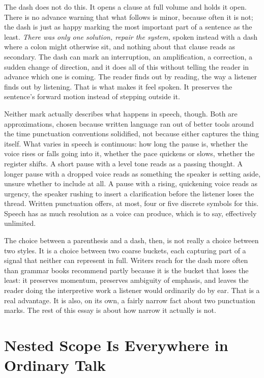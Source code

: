 \documentclass[11pt]{article}
\begin{document}
The dash does not do this. It opens a clause at full volume and holds it open. There is no advance warning that what follows is minor, because often it is not; the dash is just as happy marking the most important part of a sentence as the least. \emph{There was only one solution, repair the system,} spoken instead with a dash where a colon might otherwise sit, and nothing about that clause reads as secondary. The dash can mark an interruption, an amplification, a correction, a sudden change of direction, and it does all of this without telling the reader in advance which one is coming. The reader finds out by reading, the way a listener finds out by listening. That is what makes it feel spoken. It preserves the sentence's forward motion instead of stepping outside it.

Neither mark actually describes what happens in speech, though. Both are approximations, chosen because written language ran out of better tools around the time punctuation conventions solidified, not because either captures the thing itself. What varies in speech is continuous: how long the pause is, whether the voice rises or falls going into it, whether the pace quickens or slows, whether the register shifts. A short pause with a level tone reads as a passing thought. A longer pause with a dropped voice reads as something the speaker is setting aside, unsure whether to include at all. A pause with a rising, quickening voice reads as urgency, the speaker rushing to insert a clarification before the listener loses the thread. Written punctuation offers, at most, four or five discrete symbols for this. Speech has as much resolution as a voice can produce, which is to say, effectively unlimited.

The choice between a parenthesis and a dash, then, is not really a choice between two styles. It is a choice between two coarse buckets, each capturing part of a signal that neither can represent in full. Writers reach for the dash more often than grammar books recommend partly because it is the bucket that loses the least: it preserves momentum, preserves ambiguity of emphasis, and leaves the reader doing the interpretive work a listener would ordinarily do by ear. That is a real advantage. It is also, on its own, a fairly narrow fact about two punctuation marks. The rest of this essay is about how narrow it actually is not.

\section{Nested Scope Is Everywhere in Ordinary Talk}
\end{document}
